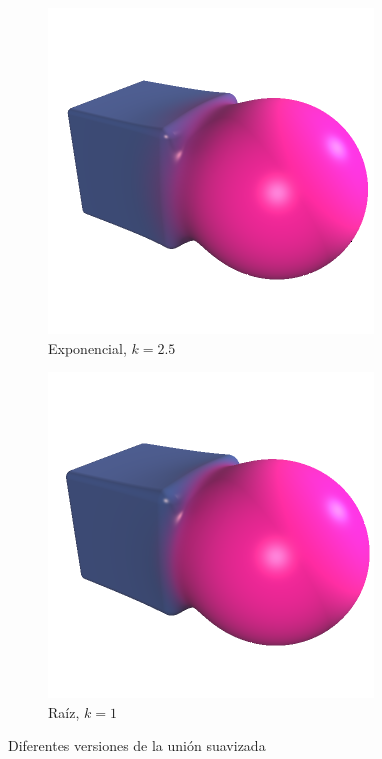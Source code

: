 \begin{figure}[htbp]
\begin{subfigure}[b]{0.25\textwidth}
        \includegraphics[width=\textwidth]{Plantilla-TFG-master/img/unionMethodExp.png}
        \caption{Exponencial, $k=2.5$}
    \end{subfigure}
    \hfill
    \begin{subfigure}[b]{0.25\textwidth}
        \centering
        \includegraphics[width=\textwidth]{Plantilla-TFG-master/img/unionMethodRoot.png}
        \caption{Raíz, $k=1$}
    \end{subfigure}
    
    \caption{Diferentes versiones de la unión suavizada}
    \label{fig:smoothVS}
\end{figure}

